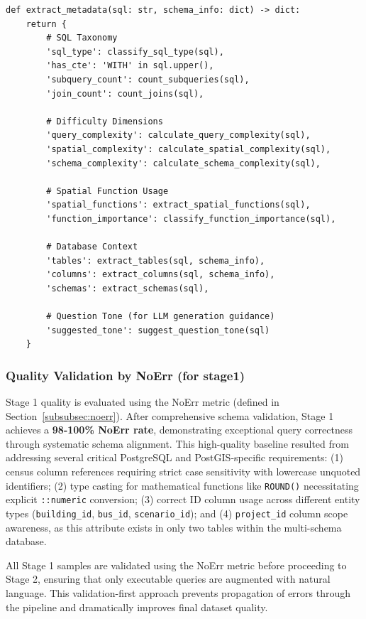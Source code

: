 \begin{lstlisting}[style=pythonstyle, caption=Metadata extraction for generated SQL]
def extract_metadata(sql: str, schema_info: dict) -> dict:
    return {
        # SQL Taxonomy
        'sql_type': classify_sql_type(sql),
        'has_cte': 'WITH' in sql.upper(),
        'subquery_count': count_subqueries(sql),
        'join_count': count_joins(sql),
        
        # Difficulty Dimensions
        'query_complexity': calculate_query_complexity(sql),
        'spatial_complexity': calculate_spatial_complexity(sql),
        'schema_complexity': calculate_schema_complexity(sql),
        
        # Spatial Function Usage
        'spatial_functions': extract_spatial_functions(sql),
        'function_importance': classify_function_importance(sql),
        
        # Database Context
        'tables': extract_tables(sql, schema_info),
        'columns': extract_columns(sql, schema_info),
        'schemas': extract_schemas(sql),
        
        # Question Tone (for LLM generation guidance)
        'suggested_tone': suggest_question_tone(sql)
    }
\end{lstlisting}

\subsubsection{Quality Validation by NoErr (for stage1)}

Stage 1 quality is evaluated using the NoErr metric (defined in Section~\ref{subsubsec:noerr}). After comprehensive schema validation, Stage 1 achieves a \textbf{98-100\% NoErr rate}, demonstrating exceptional query correctness through systematic schema alignment. This high-quality baseline resulted from addressing several critical PostgreSQL and PostGIS-specific requirements: (1) census column references requiring strict case sensitivity with lowercase unquoted identifiers; (2) type casting for mathematical functions like \texttt{ROUND()} necessitating explicit \texttt{::numeric} conversion; (3) correct ID column usage across different entity types (\texttt{building\_id}, \texttt{bus\_id}, \texttt{scenario\_id}); and (4) \texttt{project\_id} column scope awareness, as this attribute exists in only two tables within the multi-schema database.

All Stage 1 samples are validated using the NoErr metric before proceeding to Stage 2, ensuring that only executable queries are augmented with natural language. This validation-first approach prevents propagation of errors through the pipeline and dramatically improves final dataset quality.

